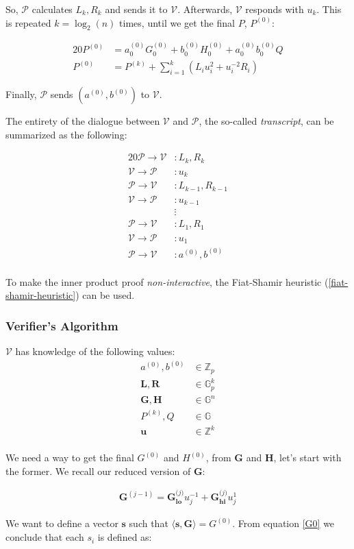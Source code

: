 \documentclass{article}
\newcommand{\eq}[1]{\begin{alignat*}{20}#1\end{alignat*}}
\newcommand{\eqn}[2]{\begin{equation}\label{#1}\begin{split}#2\end{split}\end{equation}}
\renewcommand{\vec}[1]{\boldsymbol{#1}}
\newcommand{\V}{\mathcal{V}}
\renewcommand{\P}{\mathcal{P}}
\newcommand{\G}{\mathbb{G}}
\newcommand{\Z}{\mathbb{Z}}
\newcommand{\dotp}[2]{\langle #1, #2 \rangle}
\newcommand{\opn}[1]{\operatorname{#1}}
\newcommand{\veclo}[1]{\vec{#1_{\opn{lo}}}}
\newcommand{\vechi}[1]{\vec{#1_{\opn{hi}}}}
\begin{document}
So, $\P$ calculates $L_k, R_k$ and sends it to $\V$. Afterwards,
$\V$ responds with $u_k$. This is repeated $k = \log_2(n)$ times,
until we get the final $P$, $P^{(0)}$:

\eq{
	P^{(0)} &= a^{(0)}_0 G^{(0)}_0 + b^{(0)}_0 H^{(0)}_0 + a^{(0)}_0 b^{(0)}_0 Q \\
	P^{(0)} &= P^{(k)} + \sum^k_{i=1}(L_i u^2_i + u^{-2}_i R_i)
}

Finally, $\P$ sends $(a^{(0)}, b^{(0)})$ to $\V$.

The entirety of the dialogue between $\V$ and $\P$,
the so-called \textit{transcript}, can be summarized as the following:

\eq{
	\P \rightarrow \V &: L_k, R_k \\
	\V \rightarrow \P &: u_k \\[5pt]
	\P \rightarrow \V &: L_{k-1}, R_{k-1} \\
	\V \rightarrow \P &: u_{k-1} \\[-5pt]
	                  &\vdots \\
	\P \rightarrow \V &: L_{1}, R_{1} \\
	\V \rightarrow \P &: u_{1} \\[5pt]
	\P \rightarrow \V &: a^{(0)}, b^{(0)} \\
}

To make the inner product proof \textit{non-interactive}, the
Fiat-Shamir heuristic (\ref{fiat-shamir-heuristic}) can be used.

\subsubsection{Verifier's Algorithm}

$\V$ has knowledge of the following values:
\eqn{def1-ver}{
	a^{(0)}, b^{(0)} &\in \Z_p \\
	\vec{L}, \vec{R} &\in \G_p^{k} \\
	\vec{G}, \vec{H} &\in \G^n \\
	P^{(k)}, Q &\in \G \\
	\vec{u} &\in \Z^{k} \\
}

We need a way to get the final $G^{(0)}$ and $H^{(0)}$, from $\vec{G}$
and $\vec{H}$, let's start with the former. We recall our reduced
version of $\vec{G}$:

\eqn{G0}{
	\vec{G}^{(j-1)} = \veclo{G^\textit{(j)}} u^{-1}_j + \vechi{G^\textit{(j)}} u^{1}_j
}

We want to define a vector $\vec{s}$ such that $\dotp{\vec{s}}{\vec{G}}
= G^{(0)}$. From equation \ref{G0} we conclude that each $s_i$ is
defined as:
\end{document}
